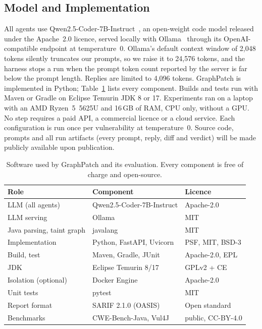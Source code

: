 \documentclass[conference]{IEEEtran}
\begin{document}
\subsection{Model and Implementation}
\label{sec:impl}
All agents use Qwen2.5-Coder-7B-Instruct~\cite{hui2024qwen25coder}, an open-weight code
model released under the Apache~2.0 licence, served locally with Ollama~\cite{ollama}
through its OpenAI-compatible endpoint at temperature~0. Ollama's default context window
of 2,048 tokens silently truncates our prompts, so we raise it to 24,576 tokens, and the
harness stops a run when the prompt token count reported by the server is far below the
prompt length. Replies are limited to 4,096 tokens. GraphPatch is implemented in Python;
Table~\ref{tab:stack} lists every component. Builds and tests run with Maven or Gradle on
Eclipse Temurin JDK 8 or 17. Experiments ran on a laptop with an AMD Ryzen~5~5625U and
16\,GB of RAM, CPU only, without a GPU. No step requires a paid API, a commercial
licence or a cloud service. Each configuration is run once per vulnerability at
temperature~0. Source code, prompts and all run artifacts (every prompt, reply, diff and
verdict) will be made publicly available upon publication.

\begin{table}[t]
\centering
\caption{Software used by GraphPatch and its evaluation. Every component is free of
charge and open-source.}
\label{tab:stack}
\footnotesize
\setlength{\tabcolsep}{3pt}
\begin{tabular}{lll}
\toprule
Role & Component & Licence \\
\midrule
LLM (all agents) & Qwen2.5-Coder-7B-Instruct & Apache-2.0 \\
LLM serving & Ollama & MIT \\
Java parsing, taint graph & javalang & MIT \\
Implementation & Python, FastAPI, Uvicorn & PSF, MIT, BSD-3 \\
Build, test & Maven, Gradle, JUnit & Apache-2.0, EPL \\
JDK & Eclipse Temurin 8/17 & GPLv2 + CE \\
Isolation (optional) & Docker Engine & Apache-2.0 \\
Unit tests & pytest & MIT \\
Report format & SARIF 2.1.0 (OASIS) & Open standard \\
Benchmarks & CWE-Bench-Java, Vul4J & public, CC-BY-4.0 \\
\bottomrule
\end{tabular}
\end{table}
\end{document}
